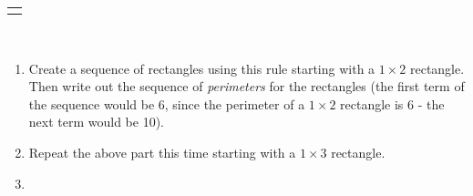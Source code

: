 \documentclass[12pt,]{book}
\theoremstyle{plain}
\theoremstyle{definition}
\theoremstyle{definition}
\theoremstyle{definition}
\numberwithin{equation}{chapter}
\newlength{\panelmax}
\begin{document}
\begin{exerciselist}
{%
\setlength{\panelmax}{0pt}
\ifdefined\panelboxAimage\else\newsavebox{\panelboxAimage}\fi%
\begin{lrbox}{\panelboxAimage}
\end{lrbox}
\ifdefined\phAimage\else\newlength{\phAimage}\fi%
\setlength{\phAimage}{\ht\panelboxAimage+\dp\panelboxAimage}
\settototalheight{\phAimage}{\usebox{\panelboxAimage}}
\setlength{\panelmax}{\maxof{\panelmax}{\phAimage}}
\leavevmode%
\setlength{\tabcolsep}{0\linewidth}
\par\medskip\noindent
\hspace*{0.2\linewidth}%
\begin{tabular}{@{}*{1}{c}@{}}
\begin{minipage}[c][\panelmax][t]{0.6\linewidth}\usebox{\panelboxAimage}\end{minipage}\end{tabular}\\
}%
\par
\hypertarget{p-206}{}%
\leavevmode%
\begin{enumerate}[label=(\alph*)]
\item\hypertarget{li-121}{}\hypertarget{p-207}{}%
Create a sequence of rectangles using this rule starting with a \(1\times 2\) rectangle. Then write out the sequence of \emph{perimeters} for the rectangles (the first term of the sequence would be 6, since the perimeter of a \(1\times 2\) rectangle is 6 - the next term would be 10). %
\item\hypertarget{li-122}{}\hypertarget{p-208}{}%
Repeat the above part this time starting with a \(1 \times 3\) rectangle. %
\item\hypertarget{li-123}{}\hypertarget{p-209}{}%

\end{enumerate}
\end{exerciselist}
\end{document}
